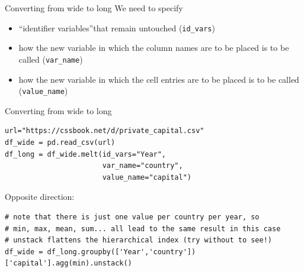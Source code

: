 \begin{frame}[fragile]{Converting from wide to long}
  We need to specify
  \begin{itemize}
  \item ``identifier variables''that remain untouched (\texttt{id\_vars})
  \item how the new variable in which the column names are to be placed is to be called (\texttt{var\_name})
  \item how the new variable in which the cell entries are to be placed is to be called (\texttt{value\_name})
  \end{itemize}
\end{frame}

\begin{frame}[fragile]{Converting from wide to long}

\begin{verbatim}
url="https://cssbook.net/d/private_capital.csv"
df_wide = pd.read_csv(url)
df_long = df_wide.melt(id_vars="Year", 
                       var_name="country", 
                       value_name="capital")
\end{verbatim}

Opposite direction:
\begin{verbatim}
# note that there is just one value per country per year, so
# min, max, mean, sum... all lead to the same result in this case
# unstack flattens the hierarchical index (try without to see!)
df_wide = df_long.groupby(['Year','country'])['capital'].agg(min).unstack()
\end{verbatim}
\end{frame}

